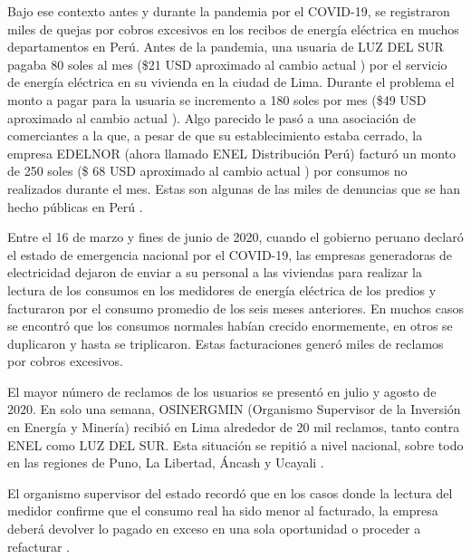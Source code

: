 Bajo ese contexto antes y durante la pandemia por el COVID-19, se registraron miles de quejas por cobros excesivos en los recibos de energía eléctrica en muchos departamentos en Perú. Antes de la pandemia, una usuaria de LUZ DEL SUR \citep{WEBSITE:32} pagaba 80 soles al mes (\$21 USD aproximado al cambio actual \citep{WEBSITE:43}) por el servicio de energía eléctrica en su vivienda en la ciudad de Lima. Durante el problema el monto a pagar para la usuaria se incremento a 180 soles por mes (\$49 USD aproximado al cambio actual \citep{WEBSITE:43}). Algo parecido le pasó a una asociación de comerciantes a la que, a pesar de que su establecimiento estaba cerrado, la empresa EDELNOR (ahora llamado ENEL Distribución Perú) \citep{WEBSITE:33} \citep{WEBSITE:34} facturó un monto de 250 soles (\$ 68 USD aproximado al cambio actual \citep{WEBSITE:43}) por consumos no realizados durante el mes. Estas son algunas de las miles de denuncias que se han hecho públicas en Perú \citep{WEBSITE:1}.

Entre el 16 de marzo y fines de junio de 2020, cuando el gobierno peruano declaró el estado de emergencia nacional por el COVID-19, las empresas generadoras de electricidad dejaron de enviar a su personal a las viviendas para realizar la lectura de los consumos en los medidores de energía eléctrica de los predios y facturaron por el consumo promedio de los seis meses anteriores. En muchos casos se encontró que los consumos normales habían crecido enormemente, en otros se duplicaron y hasta se triplicaron. Estas facturaciones generó miles de reclamos por cobros excesivos. %

El mayor número de reclamos de los usuarios se presentó en julio y agosto de 2020. En solo una semana, OSINERGMIN (Organismo Supervisor de la Inversión en Energía y Minería) recibió en Lima alrededor de 20 mil reclamos, tanto contra ENEL como LUZ DEL SUR. Esta situación se repitió a nivel nacional, sobre todo en las regiones de Puno, La Libertad, Áncash y Ucayali \citep{WEBSITE:1}.


El organismo supervisor del estado recordó que en los casos donde la lectura del medidor confirme que el consumo real ha sido menor al facturado, la empresa deberá devolver lo pagado en exceso en una sola oportunidad o proceder a refacturar \citep{WEBSITE:2}.

